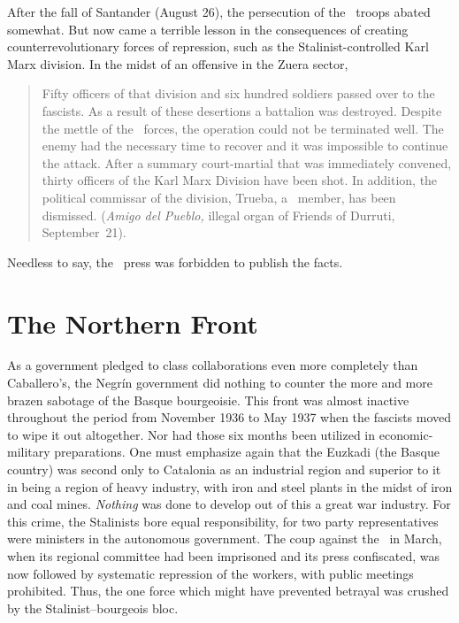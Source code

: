 After the fall of Santander (August 26), the persecution of the \CNT\ troops abated somewhat. But now came a terrible lesson in the consequences of creating counterrevolutionary forces of repression, such as the Stalinist-controlled Karl Marx division. In the midst of an offensive in the Zuera sector,

\indexCNT\indexPSUC{}
\begin{quotation}
  Fifty officers of that division and six hundred soldiers pass\-ed over to the fascists. As a result of these desertions a battalion was destroyed. Despite the mettle of the \CNT\ forces, the operation could not be terminated well. The enemy had the necessary time to recover and it was impossible to continue the attack. After a summary court-martial that was immediately convened, thirty officers of the Karl Marx Division have been shot. In addition, the political commissar of the division, Trueba, a \PSUC\ member, has been dismissed. (\emph{Amigo del Pueblo,} illegal organ of Friends of Durruti, September~21).
\end{quotation}

\noindent
Needless to say, the \CNT\ press was forbidden to publish the facts.

\section{The Northern Front}

\begin{sloppypar}
  As a government pledged to class collaborations even more completely than Caballero’s, the Negr\'in government did nothing to counter the more and more brazen sabotage of the Basque bourgeoisie. This front was almost inactive throughout the period from November 1936 to May 1937 when the fascists moved to wipe it out altogether. Nor had those six months been utilized in economic-military preparations. One must emphasize again that the Euzkadi (the Basque country) was second only to Catalonia as an industrial region and superior to it in being a region of heavy industry, with iron and steel plants in the midst of iron and coal mines. \emph{Nothing} was done to develop out of this a great war industry. For this crime\kn, the Stalinists bore equal responsibility\kn, for two party representatives were ministers in the autonomous government. The coup against the \CNT\ in March, when its regional committee had been imprisoned and its press confiscated, was now followed by systematic repression of the workers, with public meetings prohibited. Thus, the one force which might have prevented betrayal was crushed by the Stalinist--bourgeois bloc.
\end{sloppypar}

